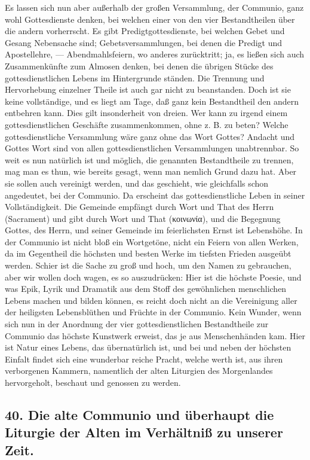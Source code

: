 Es lassen sich nun aber außerhalb der großen Versammlung, der Communio, ganz wohl Gottesdienste denken, bei welchen einer von den vier Bestandtheilen über die andern vorherrscht. Es gibt Predigtgottesdienste, bei welchen Gebet
und Gesang Nebensache sind; Gebetsversammlungen, bei denen die Predigt und Apostellehre, — Abendmahlsfeiern, wo anderes zurücktritt; ja, es ließen sich auch Zusammenkünfte zum Almosen denken, bei denen die übrigen Stücke des gottesdienstlichen Lebens im Hintergrunde ständen. Die Trennung und Hervorhebung einzelner Theile ist auch gar nicht zu beanstanden. Doch ist sie keine vollständige, und es liegt am Tage, daß ganz kein Bestandtheil den andern entbehren kann. Dies gilt insonderheit von dreien. Wer kann zu irgend einem gottesdienstlichen Geschäfte zusammenkommen, ohne z. B. zu beten? Welche gottesdienstliche Versammlung wäre ganz ohne das Wort Gottes? Andacht und Gottes Wort sind von allen gottesdienstlichen Versammlungen unabtrennbar. So weit es nun natürlich ist und möglich, die genannten Bestandtheile zu trennen, mag man es thun, wie bereits gesagt, wenn man nemlich Grund dazu hat. Aber sie sollen auch vereinigt werden, und das geschieht, wie gleichfalls schon angedeutet, bei der Communio. Da erscheint das gottesdienstliche Leben in seiner Vollständigkeit. Die Gemeinde empfängt durch Wort und That des Herrn (Sacrament) und gibt durch Wort und That (κοινωνία), und die Begegnung Gottes, des Herrn, und seiner Gemeinde im feierlichsten Ernst ist Lebenshöhe. In der Communio ist nicht bloß ein Wortgetöne, nicht ein Feiern von allen Werken, da im Gegentheil die höchsten und besten Werke im tiefsten Frieden ausgeübt werden. Schier ist die Sache zu groß und hoch, um den Namen zu gebrauchen, aber wir wollen doch wagen, es so auszudrücken: Hier ist die höchste
Poesie, und was Epik, Lyrik und Dramatik aus dem Stoff des gewöhnlichen menschlichen Lebens machen und bilden können, es reicht doch nicht an die Vereinigung aller der heiligsten Lebensblüthen und Früchte in der Communio. Kein Wunder, wenn sich nun in der Anordnung der vier gottesdienstlichen Bestandtheile zur Communio das höchste Kunstwerk erweist, das je aus Menschenhänden kam. Hier ist Natur eines Lebens, das übernatürlich ist, und bei und neben der höchsten Einfalt findet sich eine wunderbar reiche Pracht, welche werth ist, aus ihren verborgenen Kammern, namentlich der alten Liturgien des Morgenlandes hervorgeholt, beschaut und genossen zu werden.

\subsection*{40. Die alte Communio und überhaupt die Liturgie der Alten im Verhältniß zu unserer Zeit.}

